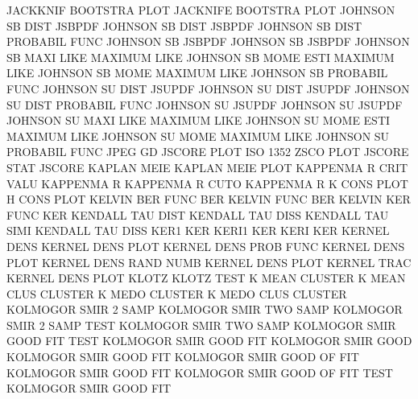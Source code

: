 JACKKNIF                                BOOTSTRA PLOT
JACKNIFE                                BOOTSTRA PLOT
JOHNSON  SB   DIST                      JSBPDF
JOHNSON  SB   DIST                      JSBPDF
JOHNSON  SB   DIST                      PROBABIL FUNC
JOHNSON  SB                             JSBPDF
JOHNSON  SB                             JSBPDF
JOHNSON  SB   MAXI LIKE                 MAXIMUM  LIKE
JOHNSON  SB   MOME ESTI                 MAXIMUM  LIKE
JOHNSON  SB   MOME                      MAXIMUM  LIKE
JOHNSON  SB                             PROBABIL FUNC
JOHNSON  SU   DIST                      JSUPDF
JOHNSON  SU   DIST                      JSUPDF
JOHNSON  SU   DIST                      PROBABIL FUNC
JOHNSON  SU                             JSUPDF
JOHNSON  SU                             JSUPDF
JOHNSON  SU   MAXI LIKE                 MAXIMUM  LIKE
JOHNSON  SU   MOME ESTI                 MAXIMUM  LIKE
JOHNSON  SU   MOME                      MAXIMUM  LIKE
JOHNSON  SU                             PROBABIL FUNC
JPEG                                    GD
JSCORE   PLOT                           ISO      1352 ZSCO PLOT
JSCORE   STAT                           JSCORE
KAPLAN   MEIE                           KAPLAN   MEIE PLOT
KAPPENMA R    CRIT VALU                 KAPPENMA R
KAPPENMA R    CUTO                      KAPPENMA R
K        CONS PLOT                      H        CONS PLOT
KELVIN   BER  FUNC                      BER
KELVIN   FUNC                           BER
KELVIN   KER  FUNC                      KER
KENDALL  TAU  DIST                      KENDALL  TAU  DISS
KENDALL  TAU  SIMI                      KENDALL  TAU  DISS
KER1                                    KER
KERI1                                   KER
KERI                                    KER
KERNEL   DENS                           KERNEL   DENS PLOT
KERNEL   DENS PROB FUNC                 KERNEL   DENS PLOT
KERNEL   DENS RAND NUMB                 KERNEL   DENS PLOT
KERNEL   TRAC                           KERNEL   DENS PLOT
KLOTZ                                   KLOTZ    TEST
K        MEAN                           CLUSTER
K        MEAN CLUS                      CLUSTER
K        MEDO                           CLUSTER
K        MEDO CLUS                      CLUSTER
KOLMOGOR SMIR 2    SAMP                 KOLMOGOR SMIR TWO  SAMP
KOLMOGOR SMIR 2    SAMP TEST            KOLMOGOR SMIR TWO  SAMP
KOLMOGOR SMIR GOOD FIT  TEST            KOLMOGOR SMIR GOOD FIT
KOLMOGOR SMIR GOOD                      KOLMOGOR SMIR GOOD FIT
KOLMOGOR SMIR GOOD OF   FIT             KOLMOGOR SMIR GOOD FIT
KOLMOGOR SMIR GOOD OF   FIT  TEST       KOLMOGOR SMIR GOOD FIT
